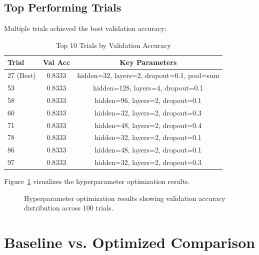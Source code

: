 \subsection{Top Performing Trials}

Multiple trials achieved the best validation accuracy:

\begin{table}[H]
\centering
\caption{Top 10 Trials by Validation Accuracy}
\label{tab:top_trials}
\begin{tabular}{lcc}
\toprule
\textbf{Trial} & \textbf{Val Acc} & \textbf{Key Parameters} \\
\midrule
27 (Best) & 0.8333 & hidden=32, layers=2, dropout=0.1, pool=sum \\
53 & 0.8333 & hidden=128, layers=4, dropout=0.1 \\
58 & 0.8333 & hidden=96, layers=2, dropout=0.1 \\
60 & 0.8333 & hidden=32, layers=2, dropout=0.3 \\
71 & 0.8333 & hidden=48, layers=2, dropout=0.4 \\
78 & 0.8333 & hidden=32, layers=2, dropout=0.1 \\
86 & 0.8333 & hidden=48, layers=2, dropout=0.1 \\
97 & 0.8333 & hidden=32, layers=2, dropout=0.3 \\
\bottomrule
\end{tabular}
\end{table}

Figure~\ref{fig:hyperopt_results} visualizes the hyperparameter optimization results.

\begin{figure}[H]
    \centering
    
    \caption{Hyperparameter optimization results showing validation accuracy distribution across 100 trials.}
    \label{fig:hyperopt_results}
\end{figure}

\section{Baseline vs. Optimized Comparison}

